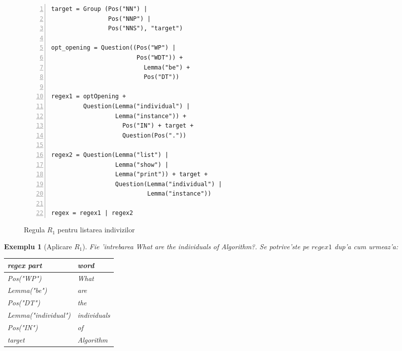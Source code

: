 \documentclass[12pt,a4paper,twoside]{report}
\newtheorem{example}{Exemplu}
\begin{document}
\begin{figure}[h]
\centering
\begin{lstlisting}[basicstyle=\footnotesize, numbers=left, xleftmargin=.05\textwidth]
target = Group (Pos("NN") | 
                Pos("NNP") | 
                Pos("NNS"), "target")
                
opt_opening = Question((Pos("WP") | 
                        Pos("WDT")) + 
                          Lemma("be") + 
                          Pos("DT"))
                          
regex1 = optOpening + 
         Question(Lemma("individual") | 
                  Lemma("instance")) + 
                    Pos("IN") + target + 
                    Question(Pos("."))
                    
regex2 = Question(Lemma("list") | 
                  Lemma("show") | 
                  Lemma("print")) + target +   
                  Question(Lemma("individual") |
                           Lemma("instance"))
                           
regex = regex1 | regex2
  \end{lstlisting}
        \caption{Regula $R_1$ pentru listarea indivizilor}
      \label{fig:r1}
  \end{figure}
  
  \begin{example}[Aplicare $R_1$] 
  Fie 'intrebarea {\it What are the individuals of Algorithm?}. Se potrive'ste pe $regex1$ dup'a cum urmeaz'a:
  
    \begin{center}
      \begin{tabular}{ll}
      regex part & word\\ \hline
      
  {\it Pos("WP")} & What\\
  {\it Lemma("be")} & are\\
  {\it Pos("DT")} & the\\
  {\it Lemma("individual")} & individuals\\
  {\it Pos("IN")} & of\\
  {\it target} & Algorithm\\
       \end{tabular}
       \end{center}
        \vspace{0.3cm}
   \end{example}
\end{document}
